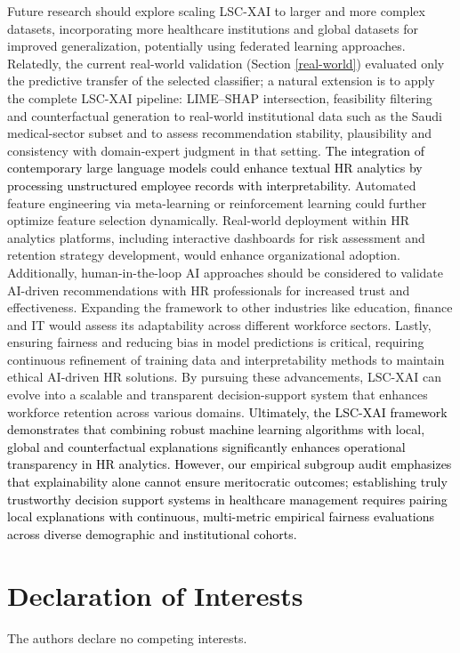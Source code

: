 \documentclass[a4paper,fleqn]{cas-sc}
\begin{document}
{Future research should explore scaling LSC-XAI to larger and more complex datasets, incorporating more healthcare institutions and global datasets for improved generalization, potentially using federated learning approaches. Relatedly, the current real-world validation (Section \ref{real-world}) evaluated only the predictive transfer of the selected classifier; a natural extension is to apply the complete LSC-XAI pipeline: LIME–SHAP intersection, feasibility filtering and counterfactual generation to real-world institutional data such as the Saudi medical-sector subset and to assess recommendation stability, plausibility and consistency with domain-expert judgment in that setting. \textcolor{black}{The integration of contemporary large language models could enhance textual HR analytics by processing unstructured employee records with interpretability.} Automated feature engineering via meta-learning or reinforcement learning could further optimize feature selection dynamically. Real-world deployment within HR analytics platforms, including interactive dashboards for risk assessment and retention strategy development, would enhance organizational adoption. Additionally, human-in-the-loop AI approaches should be considered to validate AI-driven recommendations with HR professionals for increased trust and effectiveness. Expanding the framework to other industries like education, finance and IT would assess its adaptability across different workforce sectors. Lastly, ensuring fairness and reducing bias in model predictions is critical, requiring continuous refinement of training data and interpretability methods to maintain ethical AI-driven HR solutions. By pursuing these advancements, LSC-XAI can evolve into a scalable and transparent decision-support system that enhances workforce retention across various domains.
\textcolor{black}{Ultimately, the LSC-XAI framework demonstrates that combining robust machine learning algorithms with local, global and counterfactual explanations significantly enhances operational transparency in HR analytics. However, our empirical subgroup audit emphasizes that explainability alone cannot ensure meritocratic outcomes; establishing truly trustworthy decision support systems in healthcare management requires pairing local explanations with continuous, multi-metric empirical fairness evaluations across diverse demographic and institutional cohorts.
}

\section*{Declaration of Interests}
The authors declare no competing interests.

}
\end{document}
